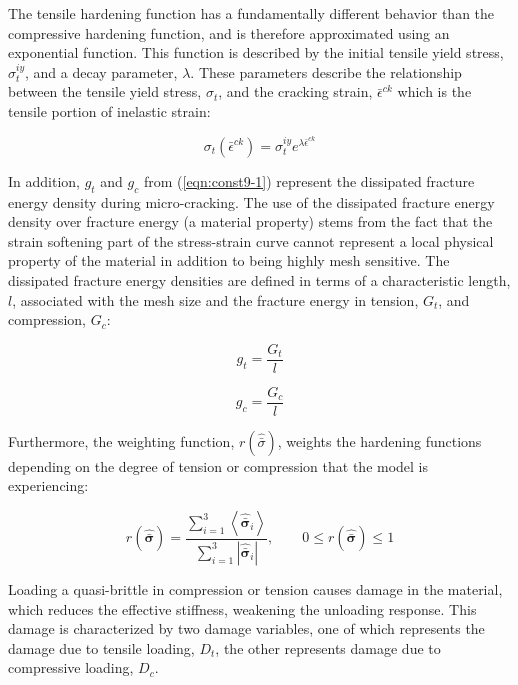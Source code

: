 The tensile hardening function has a fundamentally different behavior than the compressive hardening function, and is therefore approximated using an exponential function. This function is described by the initial tensile yield stress, $\sigma_{t}^{iy}$, and a decay parameter, $\lambda$. These parameters describe the relationship between the tensile yield stress, $\sigma_{t}$, and the cracking strain, $\bar{\epsilon}^{ck}$ which is the tensile portion of inelastic strain:

\begin{equation}
\sigma_{t}\left(\bar{\epsilon}^{ck}\right)=\sigma_{t}^{iy}e^{\lambda\bar{\epsilon}^{ck}}
\label{eqn:dam1a}
\end{equation}

In addition, $g_t$ and $g_c$ from (\ref{eqn:const9-1}) represent the dissipated fracture energy density during micro-cracking. The use of the dissipated fracture energy density over fracture energy (a material property) stems from the fact that the strain softening part of the stress-strain curve cannot represent a local physical property of the material in addition to being highly mesh sensitive. The dissipated fracture energy densities are defined in terms of a characteristic length, $l$, associated with the mesh size and the fracture energy in tension, $G_t$, and compression, $G_c$: 

\begin{equation}
g_t = \frac{G_t}{l}
\label{eqn:dam1c}
\end{equation}

\begin{equation}
g_c = \frac{G_c}{l}
\label{eqn:dam1d}
\end{equation}

Furthermore, the weighting function, $r\left(\hat{\bar{\sigma}}\right)$, weights the hardening functions depending on the degree of tension or compression that the model is experiencing:

\begin{equation}
r\left(\hat{\boldsymbol{\bar{\sigma}}}\right)=\frac{\sum_{i=1}^{3}\left\langle \hat{\boldsymbol{\bar{\sigma}}}_{i}\right\rangle }{\sum_{i=1}^{3}\left|\hat{\boldsymbol{\bar{\sigma}}}_{i}\right|},\qquad0\leq r\left(\hat{\boldsymbol{\bar{\sigma}}}\right)\leq1
\label{eqn:const9-2}
\end{equation}

Loading a quasi-brittle in compression or tension causes damage in the material, which reduces the effective stiffness, weakening the unloading response. This damage is characterized by two damage variables, one of which represents the damage due to tensile loading, $D_{t}$, the other represents damage due to compressive loading, $D_{c}$. 

